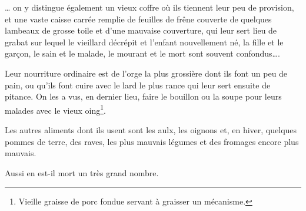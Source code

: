{… on y distingue également un vieux coffre où ils tiennent leur peu de provision, et une vaste caisse carrée remplie de feuilles de frêne couverte de quelques lambeaux de grosse toile et d’une mauvaise couverture, qui leur sert lieu de grabat sur lequel le vieillard décrépit et l’enfant nouvellement né, la fille et le garçon, le sain et le malade, le mourant et le mort sont souvent confondus….

Leur nourriture ordinaire est de l’orge la plus grossière dont ils font un peu de pain, ou qu’ils font cuire avec le lard le plus rance qui leur sert ensuite de pitance. On les a vus, en dernier lieu, faire le bouillon ou la soupe pour leurs malades avec le vieux oing\footnote{Vieille graisse de porc fondue servant à graisser un mécanisme.}.

Les autres aliments dont ils usent sont les aulx, les oignons et, en hiver, quelques pommes de terre, des raves, les plus mauvais légumes et des fromages encore plus mauvais.

Aussi en est-il mort un très grand nombre.

}

